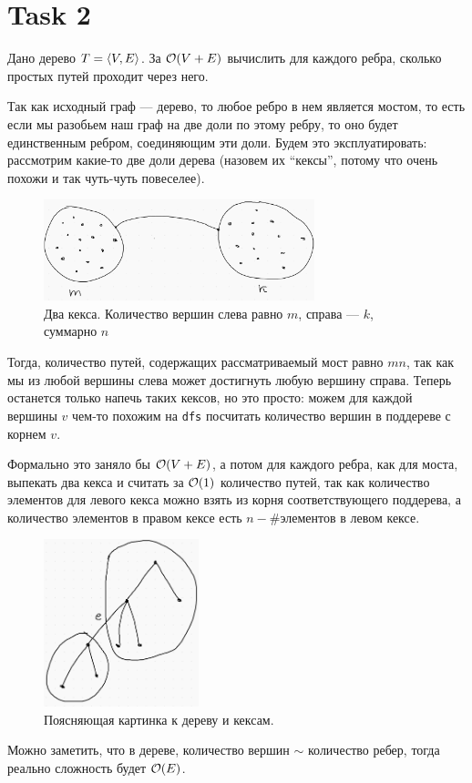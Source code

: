 \section{Task 2}
\begin{task}
    Дано дерево $T = \braket{V,E}$. За $\mathcal{O}(V + E)$ вычислить для каждого ребра, сколько простых путей проходит через него.
\end{task}

\begin{solution}
    Так как исходный граф --- дерево, то любое ребро в нем является мостом, то есть если мы разобьем наш граф на две доли по этому ребру, то оно будет единственным ребром, соединяющим эти доли.
    Будем это эксплуатировать: рассмотрим какие-то две доли дерева (назовем их ``кексы'', потому что очень похожи и так чуть-чуть повеселее).
    \begin{figure}[H]
        \centering
        \includegraphics[width=0.7\textwidth]{pics/cake.png}
        \caption{Два кекса. Количество вершин слева равно $m$, справа --- $k$, суммарно $n$}
    \end{figure}
    Тогда, количество путей, содержащих рассматриваемый мост равно $mn$, так как мы из любой вершины слева может достигнуть любую вершину справа.
    Теперь останется только напечь таких кексов, но это просто: можем для каждой вершины $v$ чем-то похожим на \texttt{dfs} посчитать количество вершин в поддереве с корнем $v$.
    
    Формально это заняло бы $\mathcal{O}(V+E)$, а потом для каждого ребра, как для моста, выпекать два кекса и считать за $\mathcal{O}(1)$ количество путей, так как количество элементов для левого кекса можно взять из корня соответствующего поддерева, а количество элементов в правом кексе есть $n -\#\text{элементов в левом кексе}$.
    \begin{figure}[H]
        \centering
        \includegraphics[width=0.4\textwidth]{pics/cake_tree.png}
        \caption{Поясняющая картинка к дереву и кексам.}
    \end{figure}
    \begin{remark}
        Можно заметить, что в дереве, количество вершин $\sim$ количество ребер, тогда реально сложность будет $\mathcal{O}(E)$.
    \end{remark}
\end{solution}

